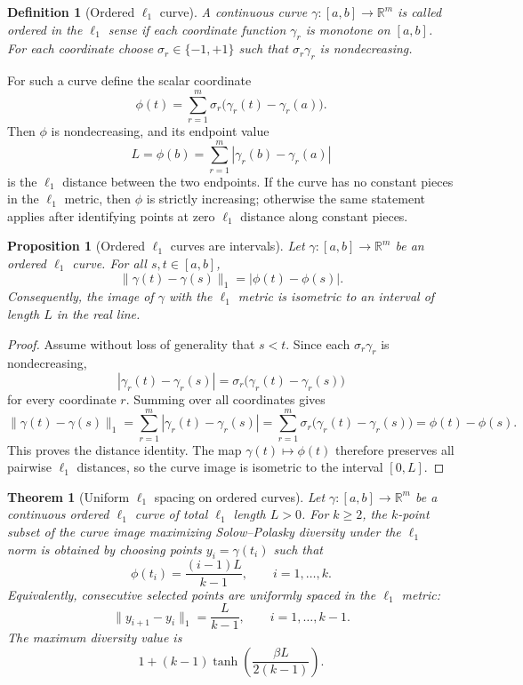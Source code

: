 \documentclass[12pt,a4paper]{article}
\newtheorem{theorem}{Theorem}
\newtheorem{proposition}{Proposition}
\newtheorem{definition}{Definition}
\begin{document}
\begin{definition}[Ordered $\ell_1$ curve]
A continuous curve $\gamma:[a,b]\to\mathbb{R}^m$ is called ordered in the $\ell_1$ sense if each coordinate function $\gamma_r$ is monotone on $[a,b]$.  For each coordinate choose $\sigma_r\in\{-1,+1\}$ such that $\sigma_r\gamma_r$ is nondecreasing.
\end{definition}

For such a curve define the scalar coordinate
\[
 \phi(t)=\sum_{r=1}^m \sigma_r\bigl(\gamma_r(t)-\gamma_r(a)\bigr).
\]
Then $\phi$ is nondecreasing, and its endpoint value
\[
 L=\phi(b)=\sum_{r=1}^m |\gamma_r(b)-\gamma_r(a)|
\]
is the $\ell_1$ distance between the two endpoints.  If the curve has no constant pieces in the $\ell_1$ metric, then $\phi$ is strictly increasing; otherwise the same statement applies after identifying points at zero $\ell_1$ distance along constant pieces.

\begin{proposition}[Ordered $\ell_1$ curves are intervals]
\label{prop:l1-isometry}
Let $\gamma:[a,b]\to\mathbb{R}^m$ be an ordered $\ell_1$ curve.  For all $s,t\in[a,b]$,
\[
 \|\gamma(t)-\gamma(s)\|_1 = |\phi(t)-\phi(s)|.
\]
Consequently, the image of $\gamma$ with the $\ell_1$ metric is isometric to an interval of length $L$ in the real line.
\end{proposition}

\begin{proof}
Assume without loss of generality that $s<t$.  Since each $\sigma_r\gamma_r$ is nondecreasing,
\[
 |\gamma_r(t)-\gamma_r(s)|
 = \sigma_r\bigl(\gamma_r(t)-\gamma_r(s)\bigr)
\]
for every coordinate $r$.  Summing over all coordinates gives
\[
 \|\gamma(t)-\gamma(s)\|_1
 = \sum_{r=1}^m |\gamma_r(t)-\gamma_r(s)|
 = \sum_{r=1}^m \sigma_r\bigl(\gamma_r(t)-\gamma_r(s)\bigr)
 = \phi(t)-\phi(s).
\]
This proves the distance identity.  The map $\gamma(t)\mapsto\phi(t)$ therefore preserves all pairwise $\ell_1$ distances, so the curve image is isometric to the interval $[0,L]$.
\end{proof}

\begin{theorem}[Uniform $\ell_1$ spacing on ordered curves]
\label{thm:l1-curve-uniform}
Let $\gamma:[a,b]\to\mathbb{R}^m$ be a continuous ordered $\ell_1$ curve of total $\ell_1$ length $L>0$.  For $k\geq2$, the $k$-point subset of the curve image maximizing Solow--Polasky diversity under the $\ell_1$ norm is obtained by choosing points $y_i=\gamma(t_i)$ such that
\[
 \phi(t_i)=\frac{(i-1)L}{k-1},
 \qquad i=1,
\ldots,k.
\]
Equivalently, consecutive selected points are uniformly spaced in the $\ell_1$ metric:
\[
 \|y_{i+1}-y_i\|_1=\frac{L}{k-1},
 \qquad i=1,\ldots,k-1.
\]
The maximum diversity value is
\[
 1+(k-1)\tanh\!\left(\frac{\beta L}{2(k-1)}\right).
\]
\end{theorem}
\end{document}
